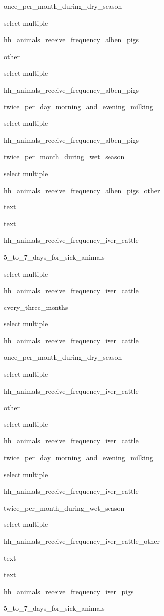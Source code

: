 \documentclass[]{article}
\begin{document}
once\_per\_month\_during\_dry\_season

select multiple

hh\_animals\_receive\_frequency\_alben\_pigs

other

select multiple

hh\_animals\_receive\_frequency\_alben\_pigs

twice\_per\_day\_morning\_and\_evening\_milking

select multiple

hh\_animals\_receive\_frequency\_alben\_pigs

twice\_per\_month\_during\_wet\_season

select multiple

hh\_animals\_receive\_frequency\_alben\_pigs\_other

text

text

hh\_animals\_receive\_frequency\_iver\_cattle

5\_to\_7\_days\_for\_sick\_animals

select multiple

hh\_animals\_receive\_frequency\_iver\_cattle

every\_three\_months

select multiple

hh\_animals\_receive\_frequency\_iver\_cattle

once\_per\_month\_during\_dry\_season

select multiple

hh\_animals\_receive\_frequency\_iver\_cattle

other

select multiple

hh\_animals\_receive\_frequency\_iver\_cattle

twice\_per\_day\_morning\_and\_evening\_milking

select multiple

hh\_animals\_receive\_frequency\_iver\_cattle

twice\_per\_month\_during\_wet\_season

select multiple

hh\_animals\_receive\_frequency\_iver\_cattle\_other

text

text

hh\_animals\_receive\_frequency\_iver\_pigs

5\_to\_7\_days\_for\_sick\_animals
\end{document}
